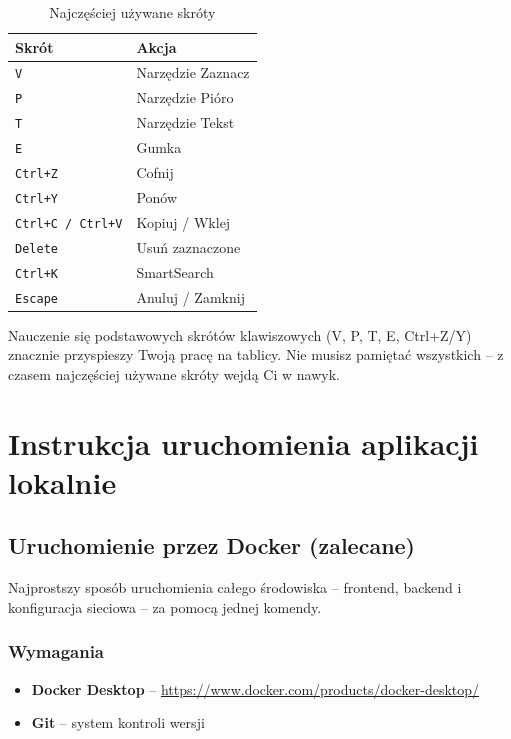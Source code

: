 \documentclass[12pt,a4paper]{article}
\begin{document}
\begin{table}[H]
\centering
\begin{tabular}{|l|l|}
\hline
\textbf{Skrót} & \textbf{Akcja} \\
\hline
\texttt{V} & Narzędzie Zaznacz \\
\hline
\texttt{P} & Narzędzie Pióro \\
\hline
\texttt{T} & Narzędzie Tekst \\
\hline
\texttt{E} & Gumka \\
\hline
\texttt{Ctrl+Z} & Cofnij \\
\hline
\texttt{Ctrl+Y} & Ponów \\
\hline
\texttt{Ctrl+C / Ctrl+V} & Kopiuj / Wklej \\
\hline
\texttt{Delete} & Usuń zaznaczone \\
\hline
\texttt{Ctrl+K} & SmartSearch \\
\hline
\texttt{Escape} & Anuluj / Zamknij \\
\hline
\end{tabular}
\caption{Najczęściej używane skróty}
\end{table}

\begin{tcolorbox}[colback=green!5!white,colframe=green!75!black,title=\faLightbulb\ Wskazówka końcowa]
Nauczenie się podstawowych skrótów klawiszowych (V, P, T, E, Ctrl+Z/Y) znacznie przyspieszy Twoją pracę na tablicy. Nie musisz pamiętać wszystkich -- z czasem najczęściej używane skróty wejdą Ci w nawyk.
\end{tcolorbox}

\newpage

\section{Instrukcja uruchomienia aplikacji lokalnie}

\subsection{Uruchomienie przez Docker (zalecane)}

Najprostszy sposób uruchomienia całego środowiska -- frontend, backend i konfiguracja sieciowa -- za pomocą jednej komendy.

\subsubsection{Wymagania}

\begin{itemize}
    \item \textbf{Docker Desktop} -- \url{https://www.docker.com/products/docker-desktop/}
    \item \textbf{Git} -- system kontroli wersji
\end{itemize}
\end{document}
